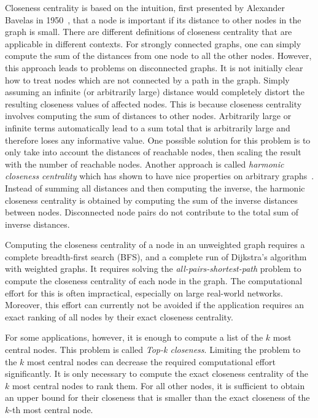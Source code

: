 Closeness centrality is based on the intuition, first presented by Alexander Bavelas in 1950~\cite{bavelas1950communication}, that a node is important if its distance to other nodes in the graph is small. There are different definitions of closeness centrality that are applicable in different contexts. For strongly connected graphs, one can simply compute the sum of the distances from one node to all the other nodes. However, this approach leads to problems on disconnected graphs. It is not initially clear how to treat nodes which are not connected by a path in the graph. Simply assuming an infinite (or arbitrarily large) distance would completely distort the resulting closeness values of affected nodes. This is because closeness centrality involves computing the sum of distances to other nodes. Arbitrarily large or infinite terms automatically lead to a sum total that is arbitrarily large and therefore loses any informative value. One possible solution for this problem is to only take into account the distances of reachable nodes, then scaling the result with the number of reachable nodes. Another approach is called \emph{harmonic closeness centrality} which has shown to have nice properties on arbitrary graphs~\cite{boldi2014axioms}. Instead of summing all distances and then computing the inverse, the harmonic closeness centrality is obtained by computing the sum of the inverse distances between nodes. Disconnected node pairs do not contribute to the total sum of inverse distances.

Computing the closeness centrality of a node in an unweighted graph requires a complete breadth-first search (BFS), and a complete run of Dijkstra's algorithm~\cite{dijkstra1959note} with weighted graphs. It requires solving the \emph{all-pairs-shortest-path} problem to compute the closeness centrality of each node in the graph. The computational effort for this is often impractical, especially on large real-world networks. Moreover, this effort can currently not be avoided if the application requires an exact ranking of all nodes by their exact closeness centrality.  

For some applications, however, it is enough to compute a list of the $k$ most central nodes. This problem is called \emph{Top-k closeness}. Limiting the problem to the $k$ most central nodes can decrease the required computational effort significantly. It is only necessary to compute the exact closeness centrality of the $k$ most central nodes to rank them. For all other nodes, it is sufficient to obtain an upper bound for their closeness that is smaller than the exact closeness of the $k$-th most central node.


